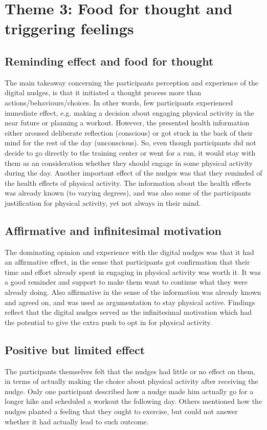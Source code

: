 \section{Theme 3: Food for thought and triggering feelings}

\subsection{Reminding effect and food for thought}
The main takeaway concerning the participants perception and experience of the digital nudges, is that it initiated a thought process more than actions/behaviours/choices. In other words, few participants experienced immediate effect, e.g. making a decision about engaging physical activity in the near future or planning a workout. However, the presented health information either aroused deliberate reflection (conscious) or got stuck in the back of their mind for the rest of the day (unconscious). So, even though participants did not decide to go directly to the training center or went for a run, it would stay with them as an consideration whether they should engage in some physical activity during the day. Another important effect of the nudges was that they reminded of the health effects of physical activity. The information about the health effects was already known (to varying degrees), and was also some of the participants justification for physical activity, yet not always in their mind. 

\subsection{Affirmative and infinitesimal motivation}
The dominating opinion and experience with the digital nudges was that it had an affirmative effect, in the sense that participants got confirmation that their time and effort already spent in engaging in physical activity was worth it. It was a good reminder and support to make them want to continue what they were already doing. Also affirmative in the sense of the information was already known and agreed on, and was used as argumentation to stay physical active. Findings reflect that the digital nudges served as the infinitesimal motivation which had the potential to give the extra push to opt in for  physical activity. 

\subsection{Positive but limited effect}
The participants themselves felt that the nudges had little or no effect on them, in terms of actually making the choice about physical activity after receiving the nudge. Only one participant described how a nudge made him actually go for a longer hike and scheduled a workout the following day. Others mentioned how the nudges planted a feeling that they ought to exercise, but could not answer whether it had actually lead to such outcome.


